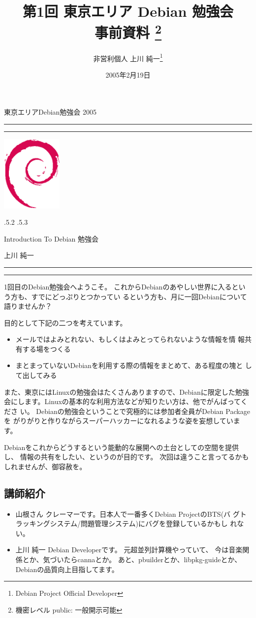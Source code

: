 \documentclass[mingoth]{jsarticle}
\makeatletter
\renewcommand{\section}{\@startsection{section}{1}{\z@}%
    {\Cvs \@plus.5\Cdp \@minus.2\Cdp}%
    {.5\Cvs \@plus.3\Cdp}%
    {\normalfont\Large\headfont\raggedright\centering}} %
\newcommand{\dancersection}[2]{%
\newpage
東京エリアDebian勉強会 2005
\hrule
\vspace{0.5mm}
\hrule
\hfill{}\includegraphics[width=3cm]{image200502/openlogo-nd.eps}\\
\vspace{-4cm}
\begin{center}
  \section{#1}
\end{center}
\hfill{}#2\hspace{3cm}\space\\
\hrule
\hrule
\vspace{1cm}
}
\makeatother
\begin{document}
\begin{titlepage}

\title{第1回 東京エリア Debian 勉強会\\事前資料
\footnote{機密レベル public: 一般開示可能}}
\date{2005年2月19日}
\author{非営利個人 上川 純一\thanks{Debian Project Official Developer}} 
\maketitle

\end{titlepage}

\newpage
\tableofcontents

\dancersection{Introduction To Debian 勉強会}{上川 純一}

1回目のDebian勉強会へようこそ。
これからDebianのあやしい世界に入るという方も、すでにどっぷりとつかってい
るという方も、月に一回Debianについて語りませんか？

目的として下記の二つを考えています。

\begin{itemize}
 \item メールではよみとれない、もしくはよみとってられないような情報を情
       報共有する場をつくる
 \item まとまっていないDebianを利用する際の情報をまとめて、ある程度の塊と
       して出してみる
\end{itemize}

また、東京にはLinuxの勉強会はたくさんありますので、Debianに限定した勉強
会にします。Linuxの基本的な利用方法などが知りたい方は、他でがんばってくださ
い。
Debianの勉強会ということで究極的には参加者全員がDebian Packageを
がりがりと作りながらスーパーハッカーになれるような姿を妄想しています。

Debianをこれからどうするという能動的な展開への土台としての空間を提供し、
情報の共有をしたい、というのが目的です。
次回は違うこと言ってるかもしれませんが、御容赦を。

\subsection{講師紹介}

\begin{itemize}
 \item{山根さん} クレーマーです。日本人で一番多くDebian ProjectのBTS(バ
      グトラッキングシステム/問題管理システム)にバグを登録しているかもし
      れない。
 \item{上川 純一} Debian Developerです。
      元超並列計算機やっていて、
      今は音楽関係とか、気づいたらcannaとか。
      あと、pbuilderとか、libpkg-guideとか、Debianの品質向上目指してます。
\end{itemize}
\end{document}
